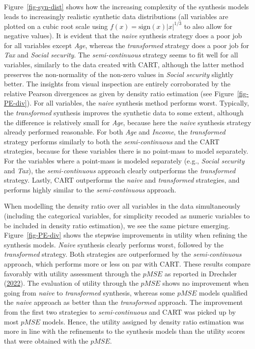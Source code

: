 \documentclass[
]{template/style/uneceart}
\begin{document}
Figure~\ref{fig-syn-dist} shows how the increasing complexity of the
synthesis models leads to increasingly realistic synthetic data
distributions (all variables are plotted on a cubic root scale using
\(f(x) = \text{sign}(x)|x|^{1/3}\) to also allow for negative values).
It is evident that the \emph{naive} synthesis strategy does a poor job
for all variables except \emph{Age}, whereas the \emph{transformed}
strategy does a poor job for \emph{Tax} and \emph{Social security}. The
\emph{semi-continuous} strategy seems to fit well for all variables,
similarly to the data created with CART, although the latter method
preserves the non-normality of the non-zero values in \emph{Social
security} slightly better. The insights from visual inspection are
entirely corroborated by the relative Pearson divergences as given by
density ratio estimation (see Figure~\ref{fig-PE-div}). For all
variables, the \emph{naive} synthesis method performs worst. Typically,
the \emph{transformed} synthesis improves the synthetic data to some
extent, although the difference is relatively small for \emph{Age},
because here the \emph{naive} synthesis strategy already performed
reasonable. For both \emph{Age} and \emph{Income}, the
\emph{transformed} strategy performs similarly to both the
\emph{semi-continuous} and the CART strategies, because for these
variables there is no point-mass to model separately. For the variables
where a point-mass is modeled separately (e.g., \emph{Social security}
and \emph{Tax}), the \emph{semi-continuous} approach clearly outperforms
the \emph{transformed} strategy. Lastly, CART outperforms the
\emph{naive} and \emph{transformed} strategies, and performs highly
similar to the \emph{semi-continuous} approach.

When modelling the density ratio over all variables in the data
simultaneously (including the categorical variables, for simplicity
recoded as numeric variables to be included in density ratio
estimation), we see the same picture emerging. Figure~\ref{fig-PE-div}
shows the stepwise improvements in utility when refining the synthesis
models. \emph{Naive} synthesis clearly performs worst, followed by the
\emph{transformed} strategy. Both strategies are outperformed by the
\emph{semi-continuous} approach, which performs more or less on par with
CART. These results compare favorably with utility assessment through
the \(pMSE\) as reported in Drechsler
(\protect\hyperlink{ref-drechsler_utility_2022}{2022}). The evaluation
of utility through the \(pMSE\) shows no improvement when going from
\emph{naive} to \emph{transformed} synthesis, whereas some \(pMSE\)
models qualified the \emph{naive} approach as better than the
\emph{transformed} approach. The improvement from the first two
strategies to \emph{semi-continuous} and CART was picked up by most
\(pMSE\) models. Hence, the utility assigned by density ratio estimation
was more in line with the refinements to the synthesis models than the
utility scores that were obtained with the \(pMSE\).
\end{document}
